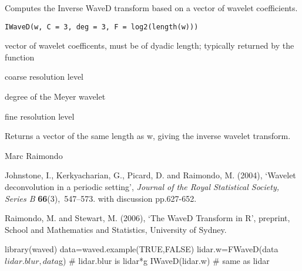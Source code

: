 \begin{Description}\relax
Computes the Inverse WaveD transform
based on a vector of wavelet coefficients.
\end{Description}
\begin{Usage}
\begin{verbatim}
IWaveD(w, C = 3, deg = 3, F = log2(length(w)))
\end{verbatim}
\end{Usage}
\begin{Arguments}
\begin{ldescription}
\item[\code{w}] vector of wavelet coefficents, must be of dyadic length; typically returned by the function 
\item[\code{C}] coarse resolution level
\item[\code{deg}] degree of the Meyer wavelet
\item[\code{F}] fine resolution level
\end{ldescription}
\end{Arguments}
\begin{Value}
Returns a vector of the same length as w, giving the inverse wavelet transform.
\end{Value}
\begin{Author}\relax
Marc Raimondo
\end{Author}
\begin{References}\relax
Johnstone, I., Kerkyacharian, G., Picard, D. and Raimondo, M.  (2004), 
`Wavelet deconvolution in a periodic
setting', {\em Journal of the Royal Statistical Society, Series B} {\bf
66}(3),~547--573.  with discussion pp.627-652.

Raimondo, M. and Stewart, M. (2006),
`The WaveD Transform in R', preprint, School and Mathematics and Statistics,
University of Sydney.
\end{References}
\begin{SeeAlso}\relax
{}
\end{SeeAlso}
\begin{Examples}
\begin{ExampleCode}
library(waved)
data=waved.example(TRUE,FALSE)
lidar.w=FWaveD(data$lidar.blur,data$g)  # lidar.blur is lidar*g 
IWaveD(lidar.w)               # same as lidar
\end{ExampleCode}
\end{Examples}

